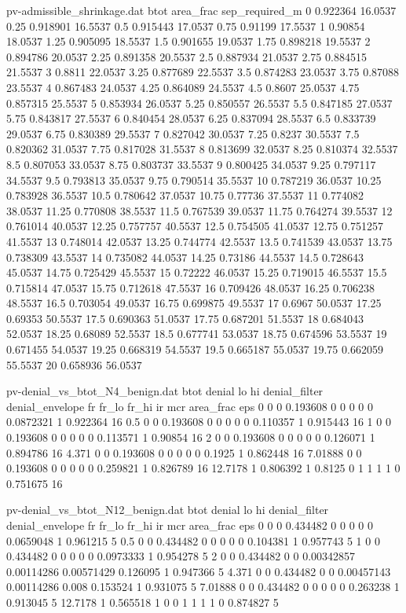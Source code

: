 \begin{filecontents*}[overwrite]{pv-admissible_shrinkage.dat}
btot area_frac sep_required_m
0 0.922364 16.0537
0.25 0.918901 16.5537
0.5 0.915443 17.0537
0.75 0.91199 17.5537
1 0.90854 18.0537
1.25 0.905095 18.5537
1.5 0.901655 19.0537
1.75 0.898218 19.5537
2 0.894786 20.0537
2.25 0.891358 20.5537
2.5 0.887934 21.0537
2.75 0.884515 21.5537
3 0.8811 22.0537
3.25 0.877689 22.5537
3.5 0.874283 23.0537
3.75 0.87088 23.5537
4 0.867483 24.0537
4.25 0.864089 24.5537
4.5 0.8607 25.0537
4.75 0.857315 25.5537
5 0.853934 26.0537
5.25 0.850557 26.5537
5.5 0.847185 27.0537
5.75 0.843817 27.5537
6 0.840454 28.0537
6.25 0.837094 28.5537
6.5 0.833739 29.0537
6.75 0.830389 29.5537
7 0.827042 30.0537
7.25 0.8237 30.5537
7.5 0.820362 31.0537
7.75 0.817028 31.5537
8 0.813699 32.0537
8.25 0.810374 32.5537
8.5 0.807053 33.0537
8.75 0.803737 33.5537
9 0.800425 34.0537
9.25 0.797117 34.5537
9.5 0.793813 35.0537
9.75 0.790514 35.5537
10 0.787219 36.0537
10.25 0.783928 36.5537
10.5 0.780642 37.0537
10.75 0.77736 37.5537
11 0.774082 38.0537
11.25 0.770808 38.5537
11.5 0.767539 39.0537
11.75 0.764274 39.5537
12 0.761014 40.0537
12.25 0.757757 40.5537
12.5 0.754505 41.0537
12.75 0.751257 41.5537
13 0.748014 42.0537
13.25 0.744774 42.5537
13.5 0.741539 43.0537
13.75 0.738309 43.5537
14 0.735082 44.0537
14.25 0.73186 44.5537
14.5 0.728643 45.0537
14.75 0.725429 45.5537
15 0.72222 46.0537
15.25 0.719015 46.5537
15.5 0.715814 47.0537
15.75 0.712618 47.5537
16 0.709426 48.0537
16.25 0.706238 48.5537
16.5 0.703054 49.0537
16.75 0.699875 49.5537
17 0.6967 50.0537
17.25 0.69353 50.5537
17.5 0.690363 51.0537
17.75 0.687201 51.5537
18 0.684043 52.0537
18.25 0.68089 52.5537
18.5 0.677741 53.0537
18.75 0.674596 53.5537
19 0.671455 54.0537
19.25 0.668319 54.5537
19.5 0.665187 55.0537
19.75 0.662059 55.5537
20 0.658936 56.0537
\end{filecontents*}
\begin{filecontents*}[overwrite]{pv-denial_vs_btot_N4_benign.dat}
btot denial lo hi denial_filter denial_envelope fr fr_lo fr_hi ir mcr area_frac eps
0 0 0 0.193608 0 0 0 0 0 0.0872321 1 0.922364 16
0.5 0 0 0.193608 0 0 0 0 0 0.110357 1 0.915443 16
1 0 0 0.193608 0 0 0 0 0 0.113571 1 0.90854 16
2 0 0 0.193608 0 0 0 0 0 0.126071 1 0.894786 16
4.371 0 0 0.193608 0 0 0 0 0 0.1925 1 0.862448 16
7.01888 0 0 0.193608 0 0 0 0 0 0.259821 1 0.826789 16
12.7178 1 0.806392 1 0.8125 0 1 1 1 1 0 0.751675 16
\end{filecontents*}
\begin{filecontents*}[overwrite]{pv-denial_vs_btot_N12_benign.dat}
btot denial lo hi denial_filter denial_envelope fr fr_lo fr_hi ir mcr area_frac eps
0 0 0 0.434482 0 0 0 0 0 0.0659048 1 0.961215 5
0.5 0 0 0.434482 0 0 0 0 0 0.104381 1 0.957743 5
1 0 0 0.434482 0 0 0 0 0 0.0973333 1 0.954278 5
2 0 0 0.434482 0 0 0.00342857 0.00114286 0.00571429 0.126095 1 0.947366 5
4.371 0 0 0.434482 0 0 0.00457143 0.00114286 0.008 0.153524 1 0.931075 5
7.01888 0 0 0.434482 0 0 0 0 0 0.263238 1 0.913045 5
12.7178 1 0.565518 1 0 0 1 1 1 1 0 0.874827 5
\end{filecontents*}
